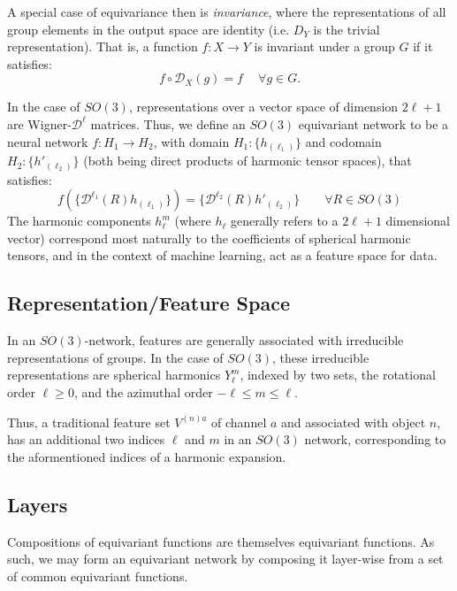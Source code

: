 \documentclass[10pt,a4paper]{article}
\begin{document}
A special case of equivariance then is \textit{invariance}, where the representations of all group elements in the output space are identity (i.e. $D_Y$ is the trivial representation). That is, a function $f:X\rightarrow Y$ is invariant under a group $G$ if it satisfies:
$$
f\circ \mathcal{D}_X(g) = f \quad
\ \forall g\in G.
$$




In the case of $SO(3)$, representations over a vector space of dimension $2\ell+1$ are Wigner-$\mathcal{D}^{\ell}$ matrices. Thus, we define an $SO(3)$ equivariant network to be a neural network $f:H_1 \rightarrow H_2$, with domain $H_1:\lbrace h_{(\ell_1)}\rbrace$ and codomain $H_2:\lbrace h'_{(\ell_2)}\rbrace$ (both being direct products of harmonic tensor spaces), that satisfies:
$$
f(\lbrace \mathcal{D}^{\ell_1}(R)h_{(\ell_1)}\rbrace) = \lbrace\mathcal{D}^{\ell_2}(R) h'_{(\ell_2)}\rbrace \quad\quad \forall R\in SO(3)
$$
The harmonic components $h_{\ell}^m$ (where $h_{\ell}$ generally refers to a $2\ell+1$ dimensional vector) correspond most naturally to the coefficients of spherical harmonic tensors, and in the context of machine learning, act as a feature space for data.

\subsection{Representation/Feature Space}
In an $SO(3)$-network, features are generally associated with irreducible representations of groups. In the case of $SO(3)$, these irreducible representations are spherical harmonics $Y_{\ell}^m$, indexed by two sets, the rotational order $\ell\geq 0$, and the azimuthal order $-\ell\leq m \leq \ell$.

Thus, a traditional feature set $V^{(n)a}$ of channel $a$ and associated with object $n$, has an additional two indices $\ell$ and $m$ in an $SO(3)$ network, corresponding to the aformentioned indices of a harmonic expansion.


\subsection{Layers}
Compositions of equivariant functions are themselves equivariant functions. As such, we may form an equivariant network by composing it layer-wise from a set of common equivariant functions.
\end{document}
